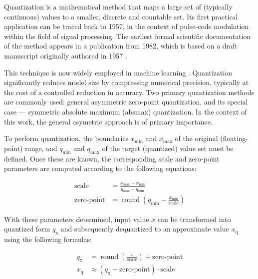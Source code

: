 {Quantization is a mathematical method that maps a large set of (typically continuous) values to a smaller, discrete and countable set.
Its first practical application can be traced back to 1957, in the context of pulse-code modulation within the field of signal processing.
The earliest formal scientific documentation of the method appears in a publication from 1982,
which is based on a draft manuscript originally authored in 1957 \cite{firstQuantization}.

This technique is now widely employed in machine learning \cite{MLQuantization1, MLQuantization2, quantnnwhite}.
Quantization significantly reduces model size \cite{quantcompression} by compressing numerical precision, typically at the cost of a controlled reduction in accuracy.
Two primary quantization methods are commonly used: general asymmetric zero-point quantization, and its special case ---
symmetric absolute maximum (absmax) quantization.
In the context of this work, the general asymetric approach is of primary importance.

To perform quantization, the boundaries \( x_{\text{min}} \) and \( x_{\text{max}} \) of the original (floating-point) range,
and \( q_{\text{min}} \) and \( q_{\text{max}} \) of the target (quantized) value set must be defined.
Once these are known, the corresponding scale and zero-point parameters are computed according to the following equations:

\clearpage
\begingroup
\setlength{\jot}{8pt} %
\begin{align}
\text{scale} &= \frac{x_{\text{max}} - x_{\text{min}}}{q_{\text{max}} - q_{\text{min}}} \label{eq:scale}\\[-2pt]
\text{zero-point} &= \operatorname{round}\!\left( q_{\text{min}} - \frac{x_{\text{min}}}{\text{scale}} \right) \label{eq:zeropoint}
\end{align}
\endgroup

With these parameters determined,
input value \( x \) can be transformed into quantized form \( q_{\text{x}} \) and subsequently dequantized to an approximate value \( x_{\text{q}} \) using the following formulas:

\begingroup
\setlength{\jot}{8pt} %
\begin{align}
q_{\text{x}} &= \operatorname{round}\!\left(\frac{x}{\text{scale}}\right) + \text{zero-point} \label{eq:quantize}\\[-2pt]
x_{\text{q}} &\approx \left( q_{\text{x}} - \text{zero-point} \right)\cdot \text{scale} \label{eq:dequantize}
\end{align}
\endgroup

}
